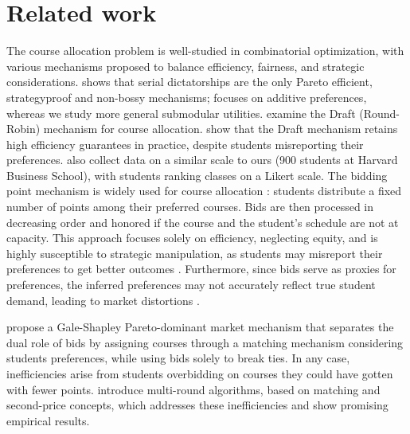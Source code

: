 \section{Related work}
The course allocation problem is well-studied in combinatorial optimization, with various mechanisms proposed to balance efficiency, fairness, and strategic considerations. 
\citet{hatfield2009serialdictatorship} shows that serial dictatorships are the only Pareto efficient, strategyproof and non-bossy mechanisms; \citeauthor{hatfield2009serialdictatorship} focuses on additive preferences, whereas we study more general submodular utilities. 
\citet{budish2012roundrobincourseallocation} examine the Draft (Round-Robin) mechanism for course allocation. 
\citeauthor{budish2012roundrobincourseallocation} show that the Draft mechanism retains high efficiency guarantees in practice, despite students misreporting their preferences. \citeauthor{budish2012roundrobincourseallocation} also collect data on a similar scale to ours (900 students at Harvard Business School), with students ranking classes on a Likert scale. 
The bidding point mechanism is widely used for course allocation \cite{sonmez2010course}: students distribute a fixed number of points among their preferred courses. 
Bids are then processed in decreasing order and honored if the course and the student's schedule are not at capacity. This approach focuses solely on efficiency, neglecting equity, and is highly susceptible to strategic manipulation, as students may misreport their preferences to get better outcomes \cite{atef2020optimization}. 
Furthermore, since bids serve as proxies for preferences, the inferred preferences may not accurately reflect true student demand, leading to market distortions \cite{sonmez2010course, krishna2008research}. 

\citet{sonmez2010course} propose a Gale-Shapley Pareto-dominant market mechanism that separates the dual role of bids by assigning courses through a matching mechanism considering students preferences, while using bids solely to break ties. In any case, inefficiencies arise from students overbidding on courses they could have gotten with fewer points. 
\citet{atef2020optimization} introduce multi-round algorithms, based on matching and second-price concepts, which addresses these inefficiencies and show promising empirical results. 

